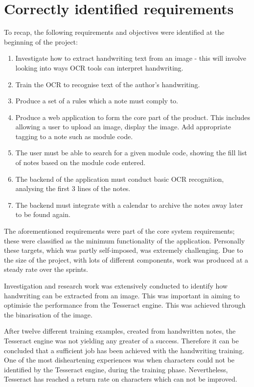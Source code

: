 \section{Correctly identified requirements}
To recap, the following requirements and objectives were identified at the beginning of the project:
\begin{enumerate}
	\item Investigate how to extract handwriting text from an image - this will involve looking into ways OCR tools can interpret handwriting.
	\item Train the OCR to recognise text of the author's handwriting.
	\item Produce a set of a rules which a note must comply to.
	\item Produce a web application to form the core part of the product. This includes allowing a user to upload an image, display the image. Add appropriate tagging to a note such as module code.
	\item The user must be able to search for a given module code, showing the fill list of notes based on the module code entered.
	\item The backend of the application must conduct basic OCR recognition, analysing the first 3 lines of the notes.
	\item The backend must integrate with a calendar to archive the notes away later to be found again.
\end{enumerate}

The aforementioned requirements were part of the core system requirements; these were classified as the minimum functionality of the application. Personally these targets, which was partly self-imposed, was extremely challenging. Due to the size of the project, with lots of different components, work was produced at a steady rate over the sprints.

Investigation and research work was extensively conducted to identify how handwriting can be extracted from an image. This was important in aiming to optimisie the performance from the Tesseract engine. This was achieved through the binarisation of the image.

After twelve different training examples, created from handwritten notes, the Tesseract engine was not yielding any greater of a success. Therefore it can be concluded that a sufficient job has been achieved with the handwriting training. One of the most disheartening experiences was when characters could not be identified by the Tesseract engine, during the training phase. Nevertheless, Tesseract has reached a return rate on characters which can not be improved.

